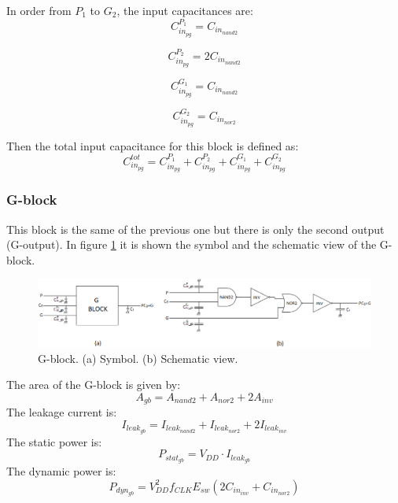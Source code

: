 In order from $P_1$ to $G_2$, the input capacitances are:
\begin{equation}
C_{in_{pg}}^{P_1} = C_{in_{nand2}}
\end{equation}

\begin{equation}
C_{in_{pg}}^{P_2} = 2 C_{in_{nand2}}
\end{equation}

\begin{equation}
C_{in_{pg}}^{G_1} = C_{in_{nand2}}
\end{equation}

\begin{equation}
C_{in_{pg}}^{G_2} = C_{in_{nor2}}
\end{equation}

Then the total input capacitance for this block is defined as:
\begin{equation}
C_{in_{pg}}^{tot} = C_{in_{pg}}^{P_1} + C_{in_{pg}}^{P_2} + C_{in_{pg}}^{G_1} + C_{in_{pg}}^{G_2}
\end{equation}





\subsubsection{G-block}
This block is the same of the previous one but there is only the second output (G-output). In figure \ref{gb} it is shown the symbol and the schematic view of the G-block.

\begin{figure}[H]
\centering
\includegraphics[width = 14cm]{pentium/gb.png}
\caption{G-block. (a) Symbol. (b) Schematic view. }
\label{gb}
\end{figure}

The  area of the G-block is given by:
\begin{equation}
A_{gb}=A_{nand2}+A_{nor2}+2A_{inv}
\end{equation}
The leakage current is:
\begin{equation}
I_{leak_{gb}}=I_{leak_{nand2}}+I_{leak_{nor2}}+2I_{leak_{inv}}
\end{equation}
The static power is:
\begin{equation}
P_{stat_{gb}}=V_{DD}\cdot I_{leak_{gb}}
\end{equation}
The dynamic power is:
\begin{equation}
P_{dyn_{gb}}=V_{DD}^2f_{CLK}E_{sw}(2C_{in_{inv}}+C_{in_{nor2}})
\end{equation}

